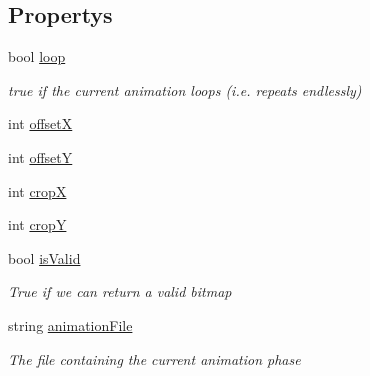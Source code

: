 \subsection*{Propertys}
\begin{DoxyCompactItemize}
\item 
bool \hyperlink{class_gruppe22_1_1_client_1_1_tile_object_aac8f058e227f664c4f5b930ee3b0bef4}{loop}
\begin{DoxyCompactList}\small\item\em true if the current animation loops (i.\-e. repeats endlessly) \end{DoxyCompactList}\item 
int \hyperlink{class_gruppe22_1_1_client_1_1_tile_object_aca5785e249ae405b4c83551cd679e6bb}{offset\-X}
\item 
int \hyperlink{class_gruppe22_1_1_client_1_1_tile_object_a747e38501941605465e87c10c1f0dec3}{offset\-Y}
\item 
int \hyperlink{class_gruppe22_1_1_client_1_1_tile_object_a27b17807e321cc1c815b4836e056f12d}{crop\-X}
\item 
int \hyperlink{class_gruppe22_1_1_client_1_1_tile_object_aa8317bc2ecd752a925526c909f9c373a}{crop\-Y}
\item 
bool \hyperlink{class_gruppe22_1_1_client_1_1_tile_object_adcf3bc51e88b76fd550b8d23202d55e4}{is\-Valid}
\begin{DoxyCompactList}\small\item\em True if we can return a valid bitmap \end{DoxyCompactList}\item 
string \hyperlink{class_gruppe22_1_1_client_1_1_tile_object_adeaefcb12857798290d66adc39ce19aa}{animation\-File}
\begin{DoxyCompactList}\small\item\em The file containing the current animation phase \end{DoxyCompactList}\item 

\end{DoxyCompactItemize}
